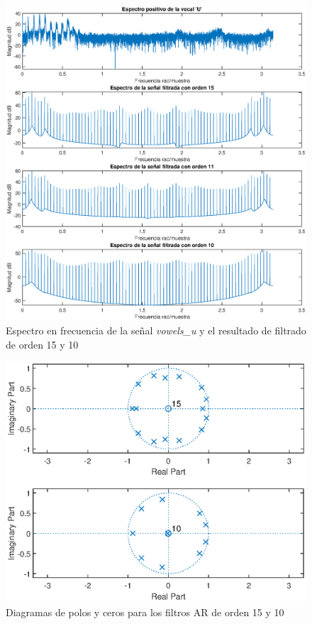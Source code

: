 \begin{figure}[H]
    \centering
    \includegraphics[scale = 0.5]{figures/4_3_filtradoU.eps}
    \caption{Espectro en frecuencia de la señal \textit{vowels\_u} y el resultado de filtrado de orden 15 y 10 }
    \label{AR-15-10}
\end{figure}

\begin{figure}[H]
    \centering
    \includegraphics[scale = 0.8]{figures/4_3_zplaneu.eps}
    \caption{Diagramas de polos y ceros para los filtros AR de orden 15 y 10}
    \label{zplane1}
\end{figure}


